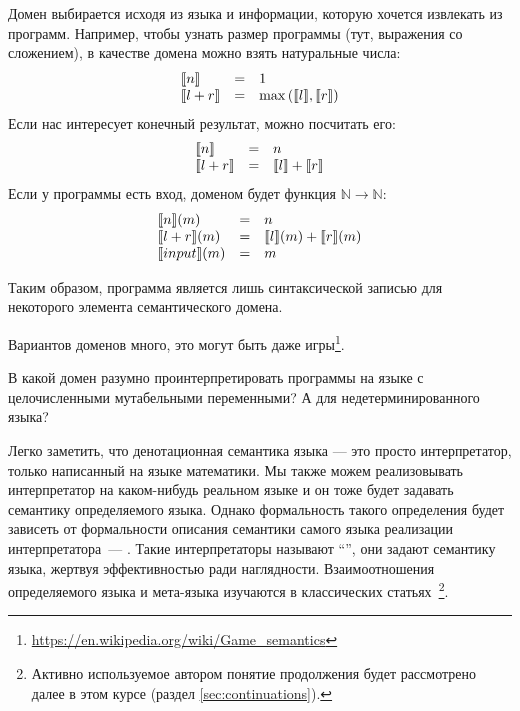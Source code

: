 Домен выбирается исходя из языка и информации, которую хочется извлекать из программ.
Например, чтобы узнать размер программы (тут, выражения со сложением), в качестве домена можно взять натуральные числа:
\[
    \begin{array}{lcl}
        \llbracket{n}\rrbracket & = & 1 \\
        \llbracket{l + r}\rrbracket & = & \max{(\llbracket{l}\rrbracket, \llbracket{r}\rrbracket)}
    \end{array}
\]
Если нас интересует конечный результат, можно посчитать его:
\[
    \begin{array}{lcl}
        \llbracket{n}\rrbracket & = & n \\
        \llbracket{l + r}\rrbracket & = & \llbracket{l}\rrbracket + \llbracket{r}\rrbracket
    \end{array}
\]
Если у программы есть вход, доменом будет функция $\mathbb{N}\to\mathbb{N}$:
\[
    \begin{array}{lcl}
        \llbracket{n}\rrbracket(m) & = & n \\
        \llbracket{l + r}\rrbracket(m) & = & \llbracket{l}\rrbracket(m) + \llbracket{r}\rrbracket(m) \\
        \llbracket{input}\rrbracket(m) & = & m
    \end{array}
\]

Таким образом, программа является лишь синтаксической записью для некоторого элемента семантического домена.

Вариантов доменов много, это могут быть даже игры\footnote{\url{https://en.wikipedia.org/wiki/Game_semantics}}. %

\begin{task}
    В какой домен разумно проинтерпретировать программы на языке с целочисленными мутабельными переменными?
    А для недетерминированного языка?
\end{task}

Легко заметить, что денотационная семантика языка --- это просто интерпретатор, только написанный на языке математики.
Мы также можем реализовывать интерпретатор на каком-нибудь реальном языке и он тоже будет задавать семантику определяемого языка.
Однако формальность такого определения будет зависеть от формальности описания семантики самого языка реализации интерпретатора~--- .
Такие интерпретаторы называют ``'', они задают семантику языка, жертвуя эффективностью ради наглядности.
Взаимоотношения определяемого языка и мета-языка изучаются в классических статьях~\cite{reynolds1972definitional,reynolds1998definitional}\footnote{Активно используемое автором понятие продолжения будет рассмотрено далее в этом курсе (раздел \ref{sec:continuations}).}.

